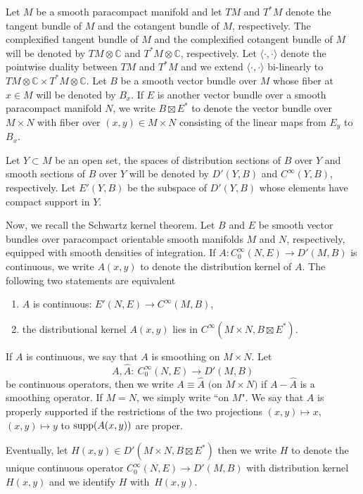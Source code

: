\documentclass[10pt,a4paper]{amsart}
\numberwithin{equation}{section}
\newcommand{\To}{\rightarrow}
\begin{document}
	 Let $M$ be a smooth paracompact manifold and let $TM$ and $T^*M$ denote the tangent bundle of $M$
	 and the cotangent bundle of $M$, respectively.
	 The complexified tangent bundle of $M$ and the complexified cotangent bundle of $M$ will be denoted by $TM\otimes \mathbb{C}$
	 and $T^*M\otimes \mathbb{C}$, respectively. Let $\langle \cdot ,\cdot \rangle$ denote the pointwise
	 duality between $TM$ and $T^*M$ and we extend $\langle \cdot ,\cdot \rangle$ bi-linearly to~${ TM\otimes \mathbb{C}\times T^*M\otimes \mathbb{C}}$.
	 Let $B$ be a smooth vector bundle over $M$ whose fiber at $x\in M$ will be denoted by $B_x$.
	 If $E$ is another vector bundle over a smooth paracompact manifold $N$, we write
	 $B\boxtimes E^*$ to denote the vector bundle over $M\times N$ with fiber over $(x, y)\in M\times N$
	 consisting of the linear maps from $E_y$ to $B_x$.
	
	 Let $Y\subset M$ be an open set, the spaces of distribution sections of $B$ over $Y$ and smooth sections of $B$ over $Y$ will be denoted by $ D'(Y, B)$ and ${C}^\infty(Y, B)$, respectively.
	 Let $ E'(Y, B)$ be the subspace of $ D'(Y, B)$ whose elements have compact support in $Y$.
	
	
	 Now, we recall the Schwartz kernel theorem.
	 Let $B$ and $E$ be smooth vector
	 bundles over paracompact orientable smooth manifolds $M$ and $N$, respectively, equipped with smooth densities of integration. If
	$A\colon {C}^\infty_0(N, E)\To D'(M, B)$
	 is continuous, we write $A(x, y)$ to denote the distribution kernel of $A$.
	 The following two statements are equivalent
	 \begin{enumerate}\itemsep=0pt
	 	\item[(1)] $A$ is continuous: $ E'(N, E)\To{C}^\infty(M, B)$,
	 	\item[(2)] the distributional kernel $A(x,y)$ lies in ${C}^\infty(M\times N,B\boxtimes E^*)$.
	 \end{enumerate}
	 If $A$ is continuous, we say that $A$ is smoothing on $M \times N$. Let
	 \[A,\hat A\colon\ {C}^\infty_0(N, E)\To{D}'(M, B)\] be continuous operators, then we write
$
	 	\mbox{$A\equiv \hat A$ (on $M\times N$)}
$
	 if $A-\hat A$ is a smoothing operator. If $M=N$, we simply write ``on $M$".
	 We say that $A$ is properly supported if the restrictions of the two projections
	 $(x,y)\mapsto x$, $(x,y)\mapsto y$ to ${\rm supp }(A(x,y))$
	 are proper.
	
	 Eventually, let $H(x,y)\in D'(M\times N, B\boxtimes E^*) $
	 then we write $H$ to denote the unique
	 continuous operator $ C^\infty_0(N,E)\To D'(M,B)$ with distribution kernel $H(x,y)$ and we identify $H$ with~$H(x,y)$.
	
\end{document}
